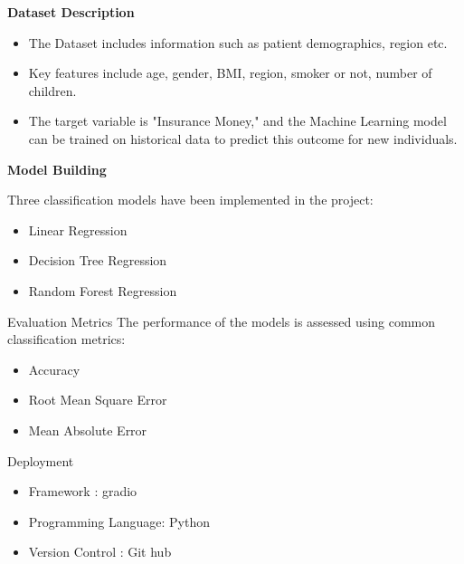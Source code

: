 \documentclass{beamer}
\begin{document}
\begin{frame}{\textbf {Dataset Description}}

\begin{itemize}

\item The Dataset includes information such as patient demographics, region etc.\\
\item  Key features include age, gender, BMI, region, smoker or not, number of children.\\
\item  The target variable is "Insurance Money," and the Machine Learning model can be trained on historical data to predict this outcome for new individuals.\\
 \end{itemize}
\end{frame}

\begin{frame}{\textbf{Model Building}}

  Three classification models have been implemented in the project:
\begin{itemize}
    \item Linear Regression\\
   \item Decision Tree Regression\\
   \item Random Forest Regression\\
\end{itemize}

\end{frame}
\begin{frame}{Evaluation Metrics}
  The performance of the models is assessed using common classification metrics:
\begin{itemize}
    \item Accuracy\\
   \item Root Mean Square Error\\
   \item Mean Absolute Error\\
\end{itemize}
\end{frame}


\begin{frame}{Deployment}
\begin{itemize}
    \item Framework : gradio \\
    \item Programming Language: Python \\
     \item Version Control : Git hub \\
\end{itemize}
\end{frame}
\end{document}
